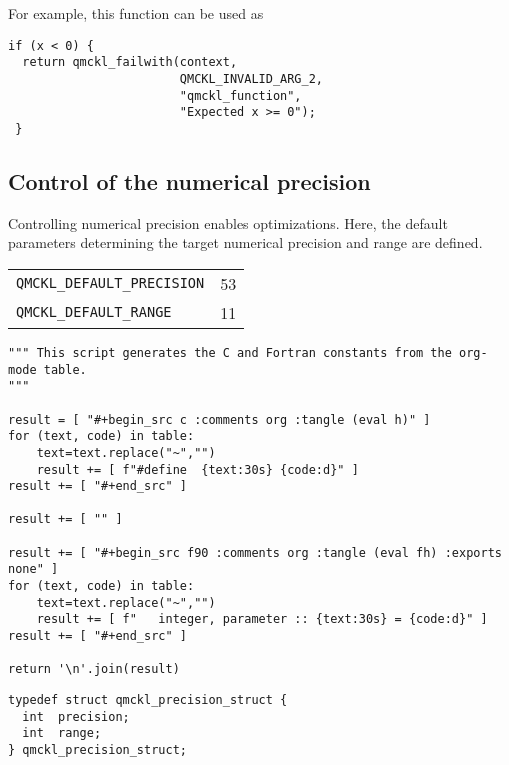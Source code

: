 For example, this function can be used as
\begin{verbatim}
if (x < 0) {
  return qmckl_failwith(context,
                        QMCKL_INVALID_ARG_2,
                        "qmckl_function", 
                        "Expected x >= 0");
 }
\end{verbatim}

\subsection{Control of the numerical precision}
\label{sec:org7e9d10b}

Controlling numerical precision enables optimizations. Here, the                                                             
default parameters determining the target numerical precision and                                                            
range are defined.                                                                                                           

\begin{table}[htbp]
\label{tab:orga45f0a8}
\centering
\begin{tabular}{lr}
\texttt{QMCKL\_DEFAULT\_PRECISION} & 53\\
\texttt{QMCKL\_DEFAULT\_RANGE} & 11\\
\end{tabular}
\end{table}

\begin{verbatim}
""" This script generates the C and Fortran constants from the org-mode table.
"""

result = [ "#+begin_src c :comments org :tangle (eval h)" ]
for (text, code) in table:
    text=text.replace("~","")
    result += [ f"#define  {text:30s} {code:d}" ]
result += [ "#+end_src" ]

result += [ "" ]

result += [ "#+begin_src f90 :comments org :tangle (eval fh) :exports none" ]
for (text, code) in table:
    text=text.replace("~","")
    result += [ f"   integer, parameter :: {text:30s} = {code:d}" ]
result += [ "#+end_src" ]

return '\n'.join(result)

\end{verbatim}

\begin{verbatim}
typedef struct qmckl_precision_struct {
  int  precision;
  int  range;
} qmckl_precision_struct;
\end{verbatim}

